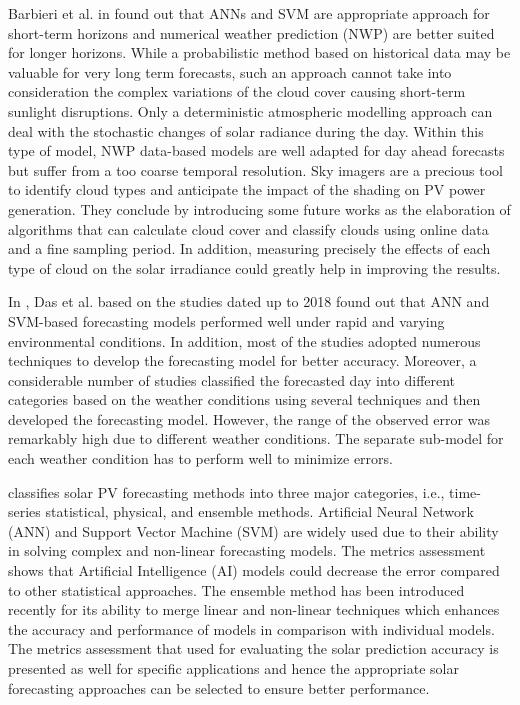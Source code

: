 Barbieri et al. in \cite{BARBIERI2017242} found out that ANNs and SVM are appropriate approach for short-term horizons and numerical weather prediction (NWP) are better suited for longer horizons.
While a probabilistic method based on historical data may be valuable for very long term forecasts, such an approach cannot take into consideration the complex variations of the cloud cover causing short-term sunlight disruptions.
Only a deterministic atmospheric modelling approach can deal with the stochastic changes of solar radiance during the day.
Within this type of model, NWP data-based models are well adapted for day ahead forecasts but suffer from a too coarse temporal resolution.
Sky imagers are a precious tool to identify cloud types and anticipate the impact of the shading on PV power generation.
They conclude by introducing some future works as the elaboration of algorithms that can calculate cloud cover and classify clouds using online data and a fine sampling period.
In addition, measuring precisely the effects of each type of cloud on the solar irradiance could greatly help in improving the results.

In \cite{DAS2018912}, Das et al. based on the studies dated up to 2018 found out that ANN and SVM-based forecasting models performed well under rapid and varying environmental conditions.
In addition, most of the studies adopted numerous techniques to develop the forecasting model for better accuracy.
Moreover, a considerable number of studies classified the forecasted day into different categories based on the weather conditions using several techniques and then developed the forecasting model.
However, the range of the observed error was remarkably high due to different weather conditions.
The separate sub-model for each weather condition has to perform well to minimize errors.

\cite{SOBRI2018459} classifies solar PV forecasting methods into three major categories, i.e., time-series statistical, physical, and ensemble methods.
Artificial Neural Network (ANN) and Support Vector Machine (SVM) are widely used due to their ability in solving complex and non-linear forecasting models.
The metrics assessment shows that Artificial Intelligence (AI) models could decrease the error compared to other statistical approaches.
The ensemble method has been introduced recently for its ability to merge linear and non-linear techniques which enhances the accuracy and performance of models in comparison with individual models.
The metrics assessment that used for evaluating the solar prediction accuracy is presented as well for specific applications and hence the appropriate solar forecasting approaches can be selected to ensure better performance.


